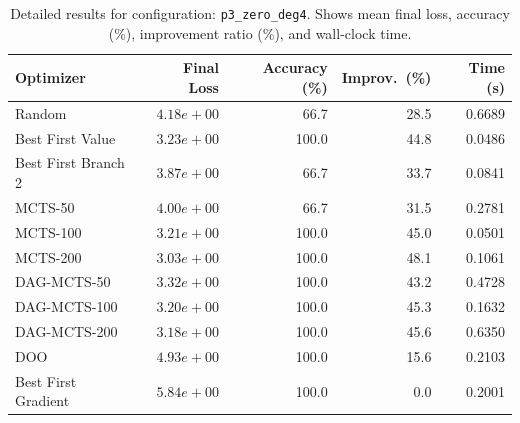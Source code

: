\begin{table}[H]
\centering
\caption{Detailed results for configuration: \texttt{p3\_zero\_deg4}. Shows mean final loss, accuracy (\%), improvement ratio (\%), and wall-clock time.}
\label{tab:funclearn-detail-12}
\begin{tabular}{lrrrr}
\toprule
Optimizer & Final Loss & Accuracy (\%) & Improv.~(\%) & Time (s) \\
\midrule
Random & $4.18e+00$ & 66.7 & 28.5 & 0.6689 \\
\hline
Best First Value & $3.23e+00$ & 100.0 & 44.8 & 0.0486 \\
\hline
Best First Branch 2 & $3.87e+00$ & 66.7 & 33.7 & 0.0841 \\
\hline
MCTS-50 & $4.00e+00$ & 66.7 & 31.5 & 0.2781 \\
\hline
MCTS-100 & $3.21e+00$ & 100.0 & 45.0 & 0.0501 \\
\hline
MCTS-200 & \textbf{$3.03e+00$} & 100.0 & 48.1 & 0.1061 \\
\hline
DAG-MCTS-50 & $3.32e+00$ & 100.0 & 43.2 & 0.4728 \\
\hline
DAG-MCTS-100 & $3.20e+00$ & 100.0 & 45.3 & 0.1632 \\
\hline
DAG-MCTS-200 & $3.18e+00$ & 100.0 & 45.6 & 0.6350 \\
\hline
DOO & $4.93e+00$ & 100.0 & 15.6 & 0.2103 \\
\hline
Best First Gradient & $5.84e+00$ & 100.0 & 0.0 & 0.2001 \\
\bottomrule
\end{tabular}
\end{table}

